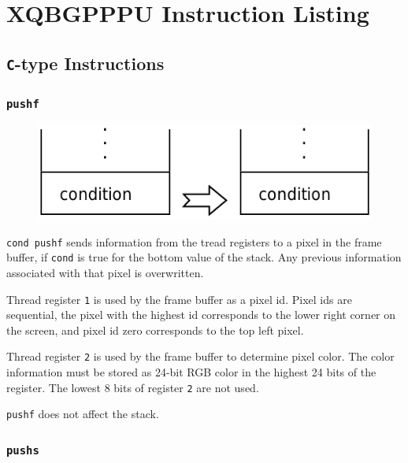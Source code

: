 \chapter{XQBGPPPU Instruction Listing}

\section{\texttt{C}-type Instructions}
	
	
	\subsection*{\texttt{pushf}}
	
		\begin{figure}
			\begin{flushright}
				\includegraphics[width=\linewidth]{figure/pdf/i_pushf} 
			\end{flushright}
			\vspace{100pt}
		\end{figure}
	
			\texttt{cond pushf} sends information from the tread registers to a
			pixel in the frame buffer, if \texttt{cond} is true for the bottom
			value of the stack. Any previous information associated with that
			pixel is overwritten.
			
			Thread register \texttt{1} is used by the frame buffer as a pixel
			id. Pixel ids are sequential, the pixel with the highest id
			corresponds to the lower right corner on the screen, and pixel id
			zero corresponds to the top left pixel.

			Thread register \texttt{2} is used by the frame buffer to determine
			pixel color. The color information must be stored as 24-bit RGB 
			color in the highest 24 bits of the register. The lowest 8 bits of
			register \texttt{2} are not used.
			
			\texttt{pushf} does not affect the stack.
	
	\qquad

	\subsection*{\texttt{pushs}}
	
